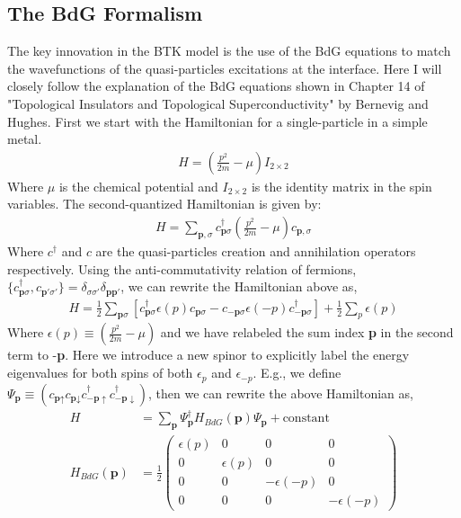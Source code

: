 \subsection{The BdG Formalism}
The key innovation in the \ac{BTK} model is the use of the \ac{BdG} equations to match the wavefunctions of the quasi-particles excitations at the interface\cite{BTK}. Here I will closely follow the explanation of the \ac{BdG} equations shown in Chapter 14 of "Topological Insulators and Topological Superconductivity" by Bernevig and Hughes\cite{bernevig_hughes_2013}. First we start with the Hamiltonian for a single-particle in a simple metal.
\begin{align}
    H = \left(\frac{p^{2}}{2m}-\mu\right)I_{2\times2}
\end{align}
Where $\mu$ is the chemical potential and $I_{2\times2}$ is the identity matrix in the spin variables. The second-quantized Hamiltonian is given by:
\begin{align}
    H = \sum_{\textbf{p},\sigma}c_{\textbf{p}\sigma}^{\dagger}\left(\frac{p^{2}}{2m}-\mu\right)c_{\textbf{p},\sigma}
\end{align}
Where $c^{\dagger}$ and $c$ are the quasi-particles creation and annihilation operators respectively. Using the anti-commutativity relation of fermions, $\{c_{\textbf{p}\sigma}^{\dagger},c_{\textbf{p}'\sigma'}\}=\delta_{\sigma\sigma'}\delta_{\textbf{p}\textbf{p}'}$, we can rewrite the Hamiltonian above as,
\begin{align}
    H = \frac{1}{2}\sum_{\textbf{p}\sigma}\left[c_{\textbf{p}\sigma}^{\dagger}\epsilon(p)c_{\textbf{p}\sigma}-c_{-\textbf{p}\sigma}\epsilon(-p)c_{-\textbf{p}\sigma}^{\dagger}\right]+\frac{1}{2}\sum_{p}\epsilon(p)
\end{align}
Where $\epsilon(p)\equiv\left(\frac{p^{2}}{2m}-\mu\right)$ and we have relabeled the sum index \textbf{p} in the second term to -\textbf{p}. Here we introduce a new spinor to explicitly label the energy eigenvalues for both spins of both $\epsilon_{p}$ and $\epsilon_{-p}$. E.g., we define $\Psi_{\textbf{p}}\equiv\left(c_{\textbf{p}\uparrow} c_{\textbf{p}\downarrow} c_{-\textbf{p}\uparrow}^{\dagger}c_{-\textbf{p}\downarrow}^{\dagger}\right)$, then we can rewrite the above Hamiltonian as,
\begin{align}
    H &= \sum_{\textbf{p}}\Psi_{\textbf{p}}^{\dagger}H_{BdG}(\textbf{p})\Psi_{\textbf{p}}+\text{constant}\\
    H_{BdG}(\textbf{p}) &= \frac{1}{2}
    \begin{pmatrix}
    \epsilon(p) & 0 & 0 & 0\\
    0 & \epsilon(p) & 0 & 0\\
    0 & 0 & -\epsilon(-p) & 0\\
    0 & 0 & 0 & -\epsilon(-p)
    \end{pmatrix}
\end{align}
